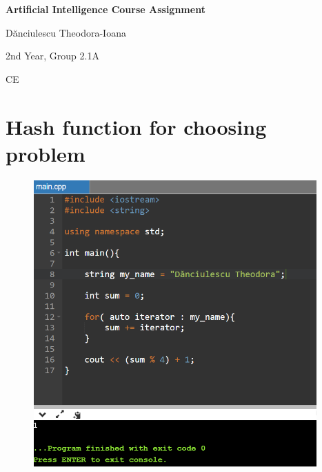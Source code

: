 \documentclass[12pt]{article}
\begin{document}
\begin{justify}
{\fontsize{18pt}{21.6pt}\selectfont \textbf{Artificial Intelligence Course Assignment}\par}
\end{justify}\par

\begin{justify}
{\fontsize{16pt}{19.2pt}\selectfont \textcolor[HTML]{008575}{Dănciulescu Theodora-Ioana}\par}
\end{justify}\par

\begin{justify}
{\fontsize{14pt}{16.8pt}\selectfont 2nd Year, Group 2.1A\par}
\end{justify}\par

\begin{justify}
{\fontsize{14pt}{16.8pt}\selectfont CE\par}
\end{justify}\par


\vspace{\baselineskip}

\vspace{\baselineskip}

\vspace{\baselineskip}
\section*{Hash function for choosing problem}



\begin{figure}[H]
\advance\leftskip 0.02in		\includegraphics[width=4.29in,height=4.32in]{./media/image11.png}
\end{figure}
\end{document}
